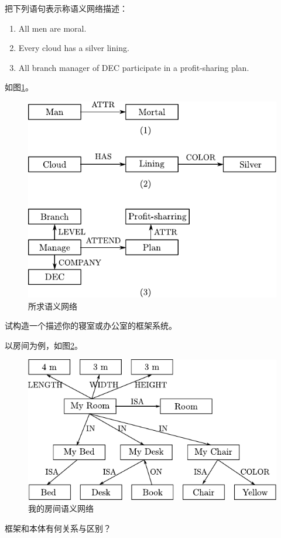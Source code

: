 \begin{question}
把下列语句表示称语义网络描述：
	\begin{enumerate}
		\item All men are moral.
		\item Every cloud has a silver lining.
		\item All branch manager of DEC participate in a profit-sharing plan. 
	\end{enumerate}
\end{question}
\begin{solution}
如图\ref{Fig:semantic-net}。
	\begin{figure}[h]
		\centering
		\includegraphics{figures/ans-2.8.pdf}
		\caption{ 所求语义网络 } \label{Fig:semantic-net}
	\end{figure}
\end{solution}

\begin{question}
试构造一个描述你的寝室或办公室的框架系统。
\end{question}
\begin{solution}
以房间为例，如图\ref{Fig:semantic-my-room}。
	\begin{figure}[h]
		\centering
		\includegraphics{figures/ans-2.9.pdf}
		\caption{ 我的房间语义网络 } \label{Fig:semantic-my-room}
	\end{figure}
\end{solution}

\begin{question}
框架和本体有何关系与区别？
\end{question}
\begin{solution}
\end{solution}
